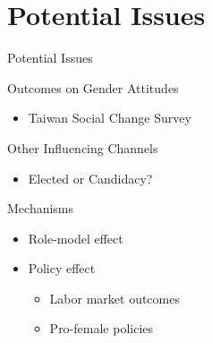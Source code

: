 \documentclass[
  9pt,
  ignorenonframetext,
  aspectratio=43,
]{beamer}
\providecommand{\tightlist}{%
  \setlength{\itemsep}{0pt}\setlength{\parskip}{0pt}}
\begin{document}
\hypertarget{potential-issues}{%
\section{Potential Issues}\label{potential-issues}}

\begin{frame}{Potential Issues}
\begin{block}{Outcomes on Gender Attitudes}
\protect\hypertarget{outcomes-on-gender-attitudes}{}
\begin{itemize}
\tightlist
\item
  Taiwan Social Change Survey
\end{itemize}
\end{block}

\begin{block}{Other Influencing Channels}
\protect\hypertarget{other-influencing-channels}{}
\begin{itemize}
\tightlist
\item
  Elected or Candidacy?
\end{itemize}
\end{block}

\begin{block}{Mechanisms}
\protect\hypertarget{mechanisms}{}
\begin{itemize}
\tightlist
\item
  Role-model effect
\item
  Policy effect

  \begin{itemize}
  \tightlist
  \item
    Labor market outcomes
  \item
    Pro-female policies
  \end{itemize}
\end{itemize}
\end{block}
\end{frame}
\end{document}
